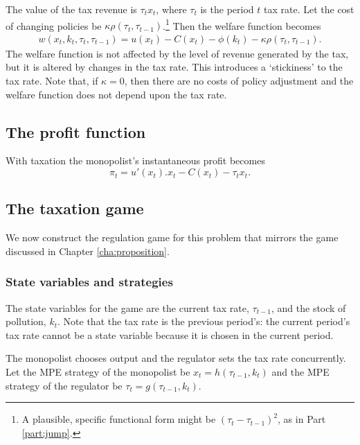 The value of the tax revenue is $\tau_t x_t$, where $\tau_t$ is the
period $t$ tax rate. Let the cost of changing policies be $\kappa
\rho(\tau_t,\tau_{t-1})$.\footnote{A plausible, specific functional
  form might be $\left(\tau_t - \tau_{t-1}\right)^2$, as in Part
  \ref{part:jump}.} Then the welfare function becomes
\begin{align}
  \label{eq:56}  w(x_t,k_t,\tau_t,\tau_{t-1}) = u(x_t) - C(x_t) - \phi(k_t) - \kappa \rho(\tau_t,\tau_{t-1}).
\end{align}
The welfare function is not affected by the level of revenue generated
by the tax, but it is altered by changes in the tax rate. This
introduces a `stickiness' to the tax rate. Note that, if $\kappa=0$,
then there are no costs of policy adjustment and the welfare function
does not depend upon the tax rate.

\subsection{The profit function}
\label{sec:profit-function}

With taxation the monopolist's instantaneous profit becomes
\begin{equation}
  \label{eq:57} \pi_t =  u'(x_t).x_t - C(x_t) - \tau_tx_t.
\end{equation}

\subsection{The taxation game}
\label{sec:delegation-game}

We now construct the regulation game for this problem that mirrors the
game discussed in Chapter \ref{cha:proposition}.

\subsubsection{State variables and strategies}
\label{sec:state-variables-1}

The state variables for the game are the current tax rate,
$\tau_{t-1}$, and the stock of pollution, $k_t$. Note that the tax
rate is the previous period's: the current period's tax rate cannot be
a state variable because it is chosen in the current period.

The monopolist chooses output and the regulator sets the tax rate
concurrently. Let the MPE strategy of the monopolist be $x_t =
h(\tau_{t-1},k_t)$ and the MPE strategy of the regulator be $\tau_t =
g(\tau_{t-1},k_t)$.

